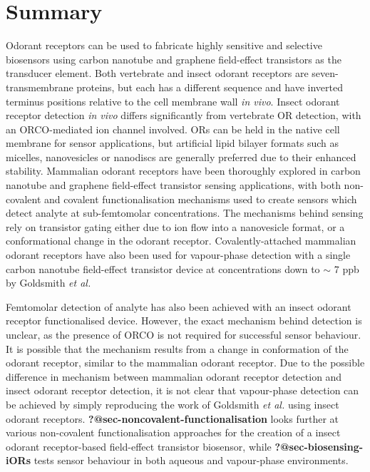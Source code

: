\documentclass[
  a4paper,
]{scrbook}
\begin{document}
\hypertarget{summary-1}{%
\section{Summary}\label{summary-1}}

Odorant receptors can be used to fabricate highly sensitive and
selective biosensors using carbon nanotube and graphene field-effect
transistors as the transducer element. Both vertebrate and insect
odorant receptors are seven-transmembrane proteins, but each has a
different sequence and have inverted terminus positions relative to the
cell membrane wall \emph{in vivo}. Insect odorant receptor detection
\emph{in vivo} differs significantly from vertebrate OR detection, with
an ORCO-mediated ion channel involved. ORs can be held in the native
cell membrane for sensor applications, but artificial lipid bilayer
formats such as micelles, nanovesicles or nanodiscs are generally
preferred due to their enhanced stability. Mammalian odorant receptors
have been thoroughly explored in carbon nanotube and graphene
field-effect transistor sensing applications, with both non-covalent and
covalent functionalisation mechanisms used to create sensors which
detect analyte at sub-femtomolar concentrations. The mechanisms behind
sensing rely on transistor gating either due to ion flow into a
nanovesicle format, or a conformational change in the odorant receptor.
Covalently-attached mammalian odorant receptors have also been used for
vapour-phase detection with a single carbon nanotube field-effect
transistor device at concentrations down to \(\sim\) 7 ppb by Goldsmith
\emph{et al.}

Femtomolar detection of analyte has also been achieved with an insect
odorant receptor functionalised device. However, the exact mechanism
behind detection is unclear, as the presence of ORCO is not required for
successful sensor behaviour. It is possible that the mechanism results
from a change in conformation of the odorant receptor, similar to the
mammalian odorant receptor. Due to the possible difference in mechanism
between mammalian odorant receptor detection and insect odorant receptor
detection, it is not clear that vapour-phase detection can be achieved
by simply reproducing the work of Goldsmith \emph{et al.} using insect
odorant receptors. \textbf{?@sec-noncovalent-functionalisation} looks
further at various non-covalent functionalisation approaches for the
creation of a insect odorant receptor-based field-effect transistor
biosensor, while \textbf{?@sec-biosensing-iORs} tests sensor behaviour
in both aqueous and vapour-phase environments.
\end{document}
